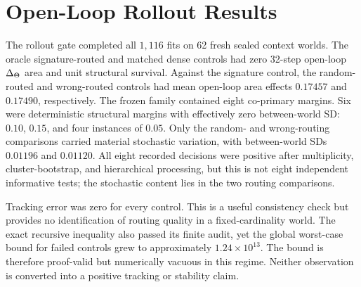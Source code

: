 \section{Open-Loop Rollout Results}
\label{sec:rollout-results}

The rollout gate completed all \(1{,}116\) fits on 62 fresh sealed context
worlds.  The oracle signature-routed and matched dense controls had zero
32-step open-loop \(\Delta_{\Theta}\) area and unit structural survival.  Against
the signature control, the random-routed and wrong-routed controls had mean
open-loop area effects \(0.17457\) and \(0.17490\), respectively.  The frozen
family contained eight co-primary margins.  Six were deterministic structural
margins with effectively zero between-world SD: \(0.10\), \(0.15\), and four
instances of \(0.05\).  Only the random- and wrong-routing comparisons carried
material stochastic variation, with between-world SDs \(0.01196\) and
\(0.01120\).  All eight recorded decisions were positive after multiplicity,
cluster-bootstrap, and hierarchical processing, but this is not eight
independent informative tests; the stochastic content lies in the two routing
comparisons.

Tracking error was zero for every control.  This is a useful consistency check
but provides no identification of routing quality in a fixed-cardinality world.
The exact recursive inequality also passed its finite audit, yet the global
worst-case bound for failed controls grew to approximately
\(1.24\times 10^{13}\).  The bound is therefore proof-valid but numerically
vacuous in this regime.  Neither observation is converted into a positive
tracking or stability claim.
